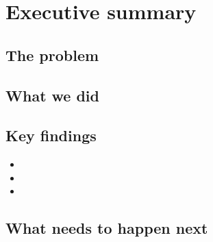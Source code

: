 \chapter*{Executive summary}

%

\section*{The problem}

\section*{What we did}

\section*{Key findings}
\begin{itemize}
  \item
  \item
  \item
\end{itemize}

\section*{What needs to happen next}

